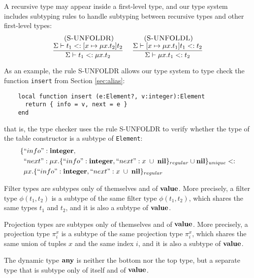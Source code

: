 A recursive type may appear inside a first-level type, and our
type system includes subtyping rules to handle subtyping between
recursive types and other first-level types:
\[
\begin{array}{c}
\begin{array}{c}
\; (\textsc{S-UNFOLDR})\\
\dfrac{\Sigma \vdash t_{1} <: [x \mapsto \mu x.t_{2}]t_{2}}
      {\Sigma \vdash t_{1} <: \mu x.t_{2}}
\end{array}
\;
\begin{array}{c}
\; (\textsc{S-UNFOLDL})\\
\dfrac{\Sigma \vdash [x \mapsto \mu x.t_{1}]t_{1} <: t_{2}}
      {\Sigma \vdash \mu x.t_{1} <: t_{2}}
\end{array}
\end{array}
\]

As an example, the rule \textsc{S-UNFOLDR} allows our type system to
type check the function \texttt{insert} from Section \ref{sec:alias}:
\begin{verbatim}
    local function insert (e:Element?, v:integer):Element
      return { info = v, next = e }
    end
\end{verbatim}
that is, the type checker uses the rule \textsc{S-UNFOLDR} to verify whether
the type of the table constructor is a subtype of \texttt{Element}:
\begin{align*}
\{ & ``info":\mathbf{integer}, \\
   & ``next":\mu x.\{``info":\mathbf{integer}, ``next":x \;\cup\; \mathbf{nil}\}_{regular} \cup \mathbf{nil} \}_{unique} <: \\
& \mu x.\{``info":\mathbf{integer}, ``next":x \;\cup\; \mathbf{nil}\}_{regular}
\end{align*}

Filter types are subtypes only of themselves and of $\mathbf{value}$.
More precisely, a filter type $\phi(t_{1},t_{2})$ is a subtype of
the same filter type $\phi(t_{1},t_{2})$, which shares the same
types $t_{1}$ and $t_{2}$, and it is also a subtype of $\mathbf{value}$.

Projection types are subtypes only of themselves and of $\mathbf{value}$.
More precisely, a projection type $\pi_{i}^{x}$ is a subtype of the
same projection type $\pi_{i}^{x}$, which shares the same union of
tuples $x$ and the same index $i$, and it is also a subtype of $\mathbf{value}$.

The dynamic type $\mathbf{any}$ is neither the bottom nor the top type,
but a separate type that is subtype only of itself and of $\mathbf{value}$.

